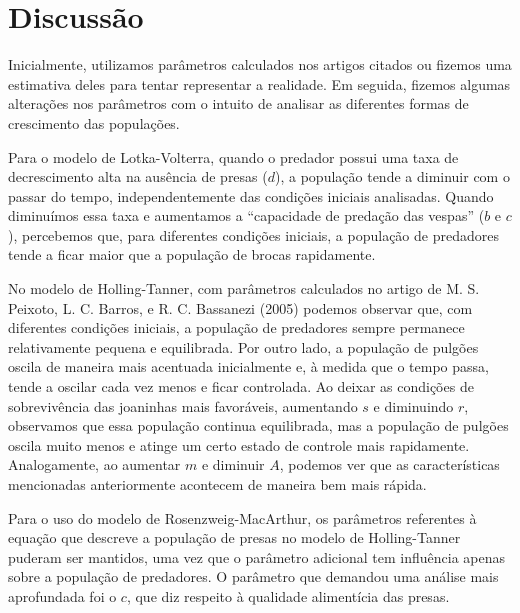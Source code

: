 \section{Discussão}

Inicialmente, utilizamos parâmetros calculados nos artigos citados ou fizemos uma estimativa deles para tentar representar a realidade. Em seguida, fizemos algumas alterações nos parâmetros com o intuito de analisar as diferentes formas de crescimento das populações. 

Para o modelo de Lotka-Volterra, quando o predador possui uma taxa de decrescimento alta na ausência de presas ($d$), a população tende a diminuir com o passar do tempo, independentemente das condições iniciais analisadas. Quando diminuímos essa taxa e aumentamos a ``capacidade de predação das vespas'' ($b$ e $c$), percebemos que, para diferentes condições iniciais, a população de predadores tende a ficar maior que a população de brocas rapidamente.

No modelo de Holling-Tanner, com parâmetros calculados no artigo de M. S. Peixoto, L. C. Barros, e R. C. Bassanezi \cite{mp_lb_rb_2005} (2005) podemos observar que, com diferentes condições iniciais, a população de predadores sempre permanece relativamente pequena e equilibrada. Por outro lado, a população de pulgões oscila de maneira mais acentuada inicialmente e, à medida que o tempo passa, tende a oscilar cada vez menos e ficar controlada. Ao deixar as condições de sobrevivência das joaninhas mais favoráveis, aumentando $s$ e diminuindo $r$, observamos que essa população continua equilibrada, mas a população de pulgões oscila muito menos e atinge um certo estado de controle mais rapidamente. Analogamente, ao aumentar $m$ e diminuir $A$, podemos ver que as características mencionadas anteriormente acontecem de maneira bem mais rápida.

Para o uso do modelo de Rosenzweig-MacArthur, os parâmetros referentes à equação que descreve a população de presas no modelo de Holling-Tanner puderam ser mantidos, uma vez que o parâmetro adicional tem influência apenas sobre a população de predadores. O parâmetro que demandou uma análise mais aprofundada foi o $c$, que diz respeito à qualidade alimentícia das presas. 
\

